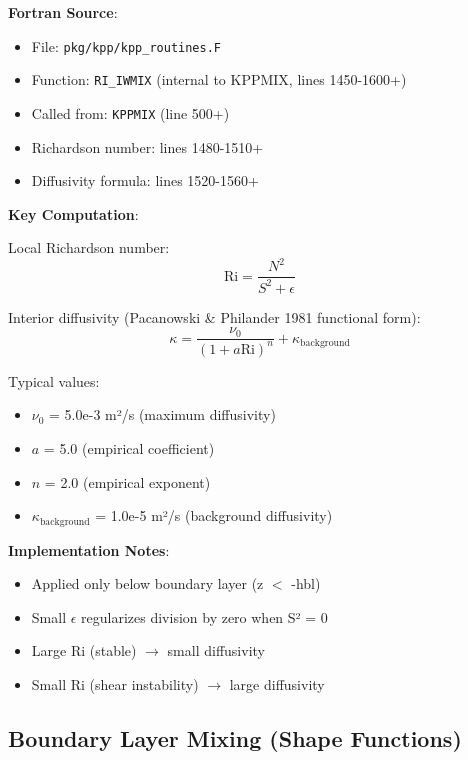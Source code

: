 \documentclass[11pt]{article}
\begin{document}
\textbf{Fortran Source}:
\begin{itemize}
    \item File: \verb|pkg/kpp/kpp_routines.F|
    \item Function: \verb|RI_IWMIX| (internal to KPPMIX, lines 1450-1600+)
    \item Called from: \verb|KPPMIX| (line 500+)
    \item Richardson number: lines 1480-1510+
    \item Diffusivity formula: lines 1520-1560+
\end{itemize}

\textbf{Key Computation}:

Local Richardson number:
\begin{equation}
\text{Ri} = \frac{N^2}{S^2 + \epsilon}
\end{equation}

Interior diffusivity (Pacanowski \& Philander 1981 functional form):
\begin{equation}
\kappa = \frac{\nu_0}{(1 + a \text{Ri})^n} + \kappa_{\text{background}}
\end{equation}

Typical values:
\begin{itemize}
    \item $\nu_0$ = 5.0e-3 m²/s (maximum diffusivity)
    \item $a$ = 5.0 (empirical coefficient)
    \item $n$ = 2.0 (empirical exponent)
    \item $\kappa_{\text{background}}$ = 1.0e-5 m²/s (background diffusivity)
\end{itemize}

\textbf{Implementation Notes}:
\begin{itemize}
    \item Applied only below boundary layer (z $<$ -hbl)
    \item Small $\epsilon$ regularizes division by zero when S² = 0
    \item Large Ri (stable) $\rightarrow$ small diffusivity
    \item Small Ri (shear instability) $\rightarrow$ large diffusivity
\end{itemize}

\subsection{Boundary Layer Mixing (Shape Functions)}
\end{document}
